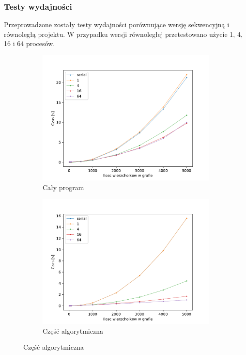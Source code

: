 \documentclass[10pt]{beamer}
\begin{document}
\begin{frame}
\frametitle{Testy wydajności}
Przeprowadzone zostały testy wydajności porównujące wersję sekwencyjną i równoległą projektu. W przypadku wersji równoległej przetestowano użycie 1, 4, 16 i 64 procesów.

\begin{figure}
\centering
\begin{subfigure}{.45\textwidth}
\centering
\includegraphics[width=\textwidth]{static/total_times.pdf}
\caption{Cały program}
\end{subfigure}
\begin{subfigure}{.45\textwidth}
\centering
\includegraphics[width=\textwidth]{static/algo_times.pdf}
\caption{Część algorytmiczna}
\end{subfigure}
\end{figure}

\end{frame}
\end{document}

